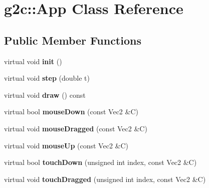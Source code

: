 \hypertarget{classg2c_1_1_app}{
\section{g2c::App Class Reference}
\label{classg2c_1_1_app}
}
\subsection*{Public Member Functions}
\begin{DoxyCompactItemize}
\item 
\hypertarget{classg2c_1_1_app_a7d948c9ba0a36f466a485f89a4990895}{
virtual void {\bfseries init} ()}
\label{classg2c_1_1_app_a7d948c9ba0a36f466a485f89a4990895}

\item 
\hypertarget{classg2c_1_1_app_aad38e92abc07652b16e28fc653727dcc}{
virtual void {\bfseries step} (double t)}
\label{classg2c_1_1_app_aad38e92abc07652b16e28fc653727dcc}

\item 
\hypertarget{classg2c_1_1_app_aafb3b402749a0cd10c1bf39e4c6ad7cf}{
virtual void {\bfseries draw} () const }
\label{classg2c_1_1_app_aafb3b402749a0cd10c1bf39e4c6ad7cf}

\item 
\hypertarget{classg2c_1_1_app_a4b9c3503ef383953559db5c8b03c4777}{
virtual bool {\bfseries mouseDown} (const Vec2 \&C)}
\label{classg2c_1_1_app_a4b9c3503ef383953559db5c8b03c4777}

\item 
\hypertarget{classg2c_1_1_app_a0e751be168e01f061a2161a0ac00e13a}{
virtual void {\bfseries mouseDragged} (const Vec2 \&C)}
\label{classg2c_1_1_app_a0e751be168e01f061a2161a0ac00e13a}

\item 
\hypertarget{classg2c_1_1_app_ae2580f73dab32b25e92f484096fdd888}{
virtual void {\bfseries mouseUp} (const Vec2 \&C)}
\label{classg2c_1_1_app_ae2580f73dab32b25e92f484096fdd888}

\item 
\hypertarget{classg2c_1_1_app_a4063add9296a5eadb6185d0f07c725d8}{
virtual bool {\bfseries touchDown} (unsigned int index, const Vec2 \&C)}
\label{classg2c_1_1_app_a4063add9296a5eadb6185d0f07c725d8}

\item 
\hypertarget{classg2c_1_1_app_a35026c076d87c5984a2ba443255ae65f}{
virtual void {\bfseries touchDragged} (unsigned int index, const Vec2 \&C)}
\label{classg2c_1_1_app_a35026c076d87c5984a2ba443255ae65f}


\end{DoxyCompactItemize}
